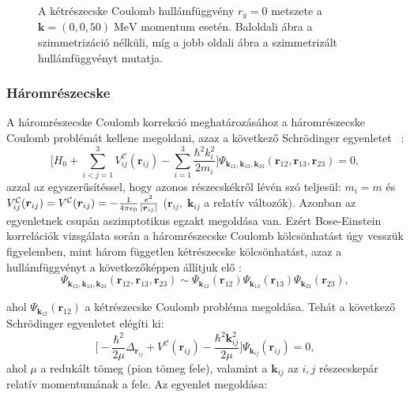 \documentclass[11pt,a4paper]{article}
\numberwithin{equation}{subsection}
\numberwithin{figure}{section}
\begin{document}
\begin{figure}[H]
\centering
\caption{A kétrészecske Coulomb hullámfüggvény $r_y=0$ metszete a $\bm{k}=(0,0,50)\;\mathrm{MeV}$ momentum esetén. Baloldali ábra a szimmetrizáció nélküli, míg a jobb oldali ábra a szimmetrizált  hullámfüggvényt mutatja. }
\end{figure}

\subsubsection{Háromrészecske}

A háromrészecske Coulomb korrekció meghatározásához a háromrészecske Coulomb problémát kellene megoldani, azaz a következő Schrödinger egyenletet ~\cite{Alt:1998nr}:
\begin{equation}
\Bigg[H_0+\sum_{i<j=1}^3V^{\mathcal{C}}_{ij}(\bm{r}_{ij})
-\sum_{i=1}^3\frac{\hbar^2 k^2_i}{2m_i}
\Bigg]\Psi_{\bm{k}_{12}, \bm{k}_{13}, \bm{k}_{23}}(\bm{r}_{12},\bm{r}_{13},\bm{r}_{23}) = 0,
\end{equation}
azzal az egyszerűsítéssel, hogy azonos részecskékről lévén szó teljesül: $m_i=m$ és $V^\mathcal{C}_{ij}(\bm{r}_{ij})=V^\mathcal{C}(\bm{r}_{ij})=-\frac{1}{4\pi\epsilon_0}\frac{e^2}{\abs{\bm{r}_{ij}}}$ ($\bm{r}_{ij},\;\bm{k}_{ij}$ a relatív változók). Azonban az egyenletnek csupán aszimptotikus egzakt megoldása van. Ezért Bose-Einstein korrelációk vizsgálata során a háromrészecske Coulomb kölcsönhatást úgy vesszük figyelemben, mint három független kétrészecske kölcsönhatást, azaz a hullámfüggvényt a következőképpen állítjuk elő : ~\cite{Alt:1998nr}
\begin{equation}
\Psi_{\bm{k}_{12}, \bm{k}_{13}, \bm{k}_{23}}(\bm{r}_{12},\bm{r}_{13},\bm{r}_{23})  \sim
\Psi_{\bm{k}_{12}}(\bm{r}_{12})\Psi_{\bm{k}_{13}}(\bm{r}_{13})\Psi_{\bm{k}_{23}}(\bm{r}_{23}),
\end{equation}

ahol $\Psi_{\bm{k}_{12}}(\bm{r}_{12})$ a kétrészecske Coulomb probléma megoldása. Tehát a következő Schrödinger egyenletet elégíti ki:
\begin{equation}
\Bigg[-\frac{\hbar^2}{2\mu}\Delta_{\bm{r}_{ij}}+V^\mathcal{C}(\bm{r}_{ij})-\frac{\hbar^2 \bm{k}^2_{ij}}{2\mu}
\Bigg]\Psi_{\bm{k}_{ij}}(\bm{r}_{ij})=0,
\end{equation}
ahol $\mu$ a redukált tömeg (pion tömeg fele), valamint a $\bm{k}_{ij}$ az $i,j$ részecskepár relatív momentumának a fele. Az egyenlet megoldása:
\end{document}
